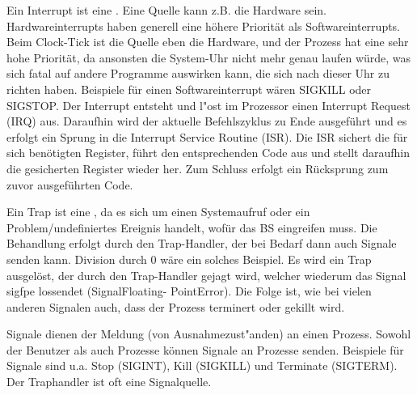 \begin{answer}
  Ein Interrupt ist eine . Eine Quelle kann z.B. die Hardware sein. Hardwareinterrupts haben generell eine höhere Priorität als Softwareinterrupts.
  Beim Clock-Tick ist die Quelle eben die Hardware, und der Prozess hat eine sehr hohe
  Priorität, da ansonsten die System-Uhr nicht mehr genau laufen würde, was sich fatal auf
  andere Programme auswirken kann, die sich nach dieser Uhr zu richten haben.
  Beispiele für einen Softwareinterrupt wären SIGKILL oder SIGSTOP.
  Der Interrupt entsteht und l"ost im Prozessor einen Interrupt Request (IRQ) aus.
  Daraufhin wird der aktuelle Befehlszyklus zu Ende ausgeführt und es erfolgt ein Sprung in die Interrupt Service Routine (ISR).
  Die ISR sichert die für sich benötigten Register, führt den entsprechenden Code aus und stellt daraufhin die gesicherten Register wieder her.
  Zum Schluss erfolgt ein Rücksprung zum zuvor ausgeführten Code.
\end{answer}

\begin{answer}
  Ein Trap ist eine , da es sich um einen Systemaufruf oder ein Problem/undefiniertes Ereignis handelt, wofür das BS eingreifen muss.
  Die Behandlung erfolgt durch den Trap-Handler, der bei Bedarf dann auch Signale senden
  kann. Division durch 0 wäre ein solches Beispiel. Es wird ein Trap ausgelöst, der durch den
  Trap-Handler gejagt wird, welcher wiederum das Signal sigfpe lossendet (SignalFloating-
  PointError). Die Folge ist, wie bei vielen anderen Signalen auch, dass der Prozess terminert
  oder gekillt wird.
\end{answer}

\begin{answer}
  Signale dienen der Meldung (von Ausnahmezust"anden) an einen Prozess. Sowohl der Benutzer als auch Prozesse können Signale an Prozesse senden. Beispiele für Signale sind u.a. Stop (SIGINT), Kill (SIGKILL) und Terminate (SIGTERM). Der Traphandler ist oft eine Signalquelle.
\end{answer}


